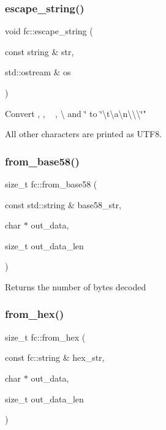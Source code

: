 \subsubsection{\texorpdfstring{escape\+\_\+string()}{escape\_string()}}
{\footnotesize\ttfamily void fc\+::escape\+\_\+string (\begin{DoxyParamCaption}\item[{const string \&}]{str,  }\item[{std\+::ostream \&}]{os }\end{DoxyParamCaption})}

Convert \textquotesingle{}\textquotesingle{}, \textquotesingle{}{\itshape }\textquotesingle{}, \textquotesingle{}~\newline
\textquotesingle{}, \textquotesingle{}\textbackslash{}\textquotesingle{} and \textquotesingle{}\char`\"{}\textquotesingle{} to \char`\"{}\textbackslash{}t\textbackslash{}a\textbackslash{}n\textbackslash{}\textbackslash{}\textbackslash{}\char`\"{}"

All other characters are printed as U\+T\+F8. \mbox{\label{namespacefc_a6f54a8adb9386444b669df3240e4f60d}} 
\subsubsection{\texorpdfstring{from\+\_\+base58()}{from\_base58()}}
{\footnotesize\ttfamily size\+\_\+t fc\+::from\+\_\+base58 (\begin{DoxyParamCaption}\item[{const std\+::string \&}]{base58\+\_\+str,  }\item[{char $\ast$}]{out\+\_\+data,  }\item[{size\+\_\+t}]{out\+\_\+data\+\_\+len }\end{DoxyParamCaption})}

\begin{DoxyReturn}{Returns}
the number of bytes decoded 
\end{DoxyReturn}
\mbox{\label{namespacefc_a9f13171c9f0aa7238c3369325df52c1e}} 
\subsubsection{\texorpdfstring{from\+\_\+hex()}{from\_hex()}}
{\footnotesize\ttfamily size\+\_\+t fc\+::from\+\_\+hex (\begin{DoxyParamCaption}\item[{const fc\+::string \&}]{hex\+\_\+str,  }\item[{char $\ast$}]{out\+\_\+data,  }\item[{size\+\_\+t}]{out\+\_\+data\+\_\+len }\end{DoxyParamCaption})}

